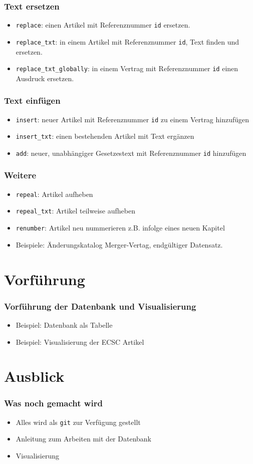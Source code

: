 \documentclass[xcolor=dvipsnames]{beamer} %
\begin{document}
\begin{frame}
  \frametitle{Text ersetzen}
  \begin{itemize}
  \item \texttt{replace}: einen Artikel mit Referenznummer \texttt{id}
    ersetzen.
  \item \texttt{replace\_txt}: in einem Artikel mit Referenznummer \texttt{id},
   Text finden und ersetzen.
 \item \texttt{replace\_txt\_globally}: in einem Vertrag mit Referenznummer
   \texttt{id} einen Ausdruck ersetzen.
  \end{itemize}
\end{frame}

\begin{frame}
  \frametitle{Text einfügen}
  \begin{itemize}
  \item \texttt{insert}: neuer Artikel mit Referenznummer \texttt{id} zu einem
    Vertrag hinzufügen
  \item \texttt{insert\_txt}: einen bestehenden Artikel mit Text ergänzen
  \item \texttt{add}: neuer, unabhängiger Gesetzestext mit Referenznummer
    \texttt{id} hinzufügen
  \end{itemize}
\end{frame}

\begin{frame}
  \frametitle{Weitere}
  \begin{itemize}
  \item \texttt{repeal}: Artikel aufheben
  \item \texttt{repeal\_txt}: Artikel teilweise aufheben
  \item \texttt{renumber}: Artikel neu nummerieren z.B. infolge eines neuen
    Kapitel      
  \item Beispiele: Änderungskatalog Merger-Vertag, endgültiger Datensatz.
  \end{itemize}
\end{frame}

\section{Vorführung}
\begin{frame}
  \frametitle{Vorführung der Datenbank und Visualisierung}
  \begin{itemize}
  \item Beispiel: Datenbank als Tabelle
  \item Beispiel: Visualisierung der ECSC Artikel 
  \end{itemize}
\end{frame}

\section{Ausblick}
\begin{frame}
  \frametitle{Was noch gemacht wird}
  \begin{itemize}
  \item Alles wird als \texttt{git} zur Verfügung gestellt
  \item Anleitung zum Arbeiten mit der Datenbank
  \item Visualisierung
  \end{itemize}
\end{frame}
\end{document}
